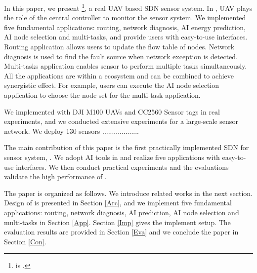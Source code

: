 In this paper, we present {\sdn}\footnote{{\sdn} is .}, 
a real UAV based SDN sensor system.
In {\sdn}, UAV plays the role of the central controller to monitor the sensor system.
We implemented five fundamental applications: routing, network diagnosis, 
AI energy prediction, AI node selection and multi-tasks,
and provide users with easy-to-use interfaces.
Routing application allows users to update the flow table of nodes.
Network diagnosis is used to find the fault source when network exception is detected.
Multi-tasks application enables sensor to perform multiple 
tasks simultaneously. All the applications are within a ecosystem
and can be combined to achieve synergistic effect. For example,
users can execute the AI node selection application to choose
the node set for the multi-task application. 


We implemented {\sdn} with DJI M100 UAVs and CC2560 Sensor tags in real experiments, and we conducted extensive experiments for a large-scale sensor network. We deploy 130 sensors ...................
\iffalse
Adler improves localization accuracy of $20$ sensors by reducing $78.4\%$ root-mean-square error (RMSE) compared to methods by multi-hop networks or mobile vehicles. Adler achieves about $10\%$ higher package receiving ratio compared to notable mobile sink methods for gathering application. Adler reduces sensors' average energy consumption by about $80\%$ compared to multi-hop based methods. When the number of sensor nodes increases or some nodes run out of energy, Adler is more resilient and holds better performance than the state-of-the-art methods.
\fi

The main contribution of this paper is the first practically implemented SDN for sensor system, {\sdn}. 
We adopt AI tools in {\sdn} and realize five applications with easy-to-use interfaces.
We then conduct practical experiments and the evaluations validate the high performance of {\sdn}.

The paper is organized as follows. We introduce related works in the next section. 
Design of {\sdn} is presented in Section \ref{Arc}, 
and we implement five fundamental applications: routing, network diagnosis, 
AI prediction, AI node selection and multi-tasks in Section \ref{App}. 
Section \ref{Imp} gives the implement setup.
The evaluation results are provided in Section \ref{Eva} 
and we conclude the paper in Section \ref{Con}.


